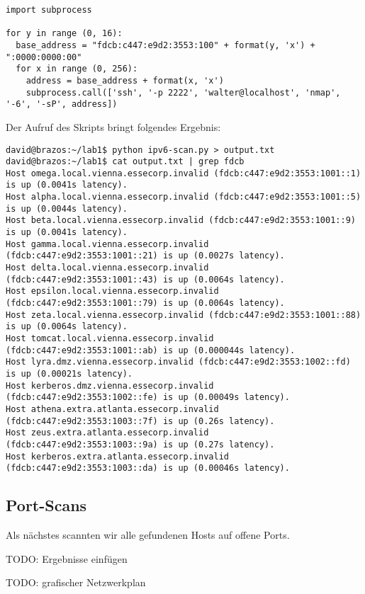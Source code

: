 \begin{lstlisting}
import subprocess

for y in range (0, 16):
  base_address = "fdcb:c447:e9d2:3553:100" + format(y, 'x') + ":0000:0000:00"
  for x in range (0, 256):
    address = base_address + format(x, 'x')
    subprocess.call(['ssh', '-p 2222', 'walter@localhost', 'nmap', '-6', '-sP', address])
\end{lstlisting}

Der Aufruf des Skripts bringt folgendes Ergebnis:

\begin{lstlisting}
david@brazos:~/lab1$ python ipv6-scan.py > output.txt
david@brazos:~/lab1$ cat output.txt | grep fdcb
Host omega.local.vienna.essecorp.invalid (fdcb:c447:e9d2:3553:1001::1) is up (0.0041s latency).
Host alpha.local.vienna.essecorp.invalid (fdcb:c447:e9d2:3553:1001::5) is up (0.0044s latency).
Host beta.local.vienna.essecorp.invalid (fdcb:c447:e9d2:3553:1001::9) is up (0.0041s latency).
Host gamma.local.vienna.essecorp.invalid (fdcb:c447:e9d2:3553:1001::21) is up (0.0027s latency).
Host delta.local.vienna.essecorp.invalid (fdcb:c447:e9d2:3553:1001::43) is up (0.0064s latency).
Host epsilon.local.vienna.essecorp.invalid (fdcb:c447:e9d2:3553:1001::79) is up (0.0064s latency).
Host zeta.local.vienna.essecorp.invalid (fdcb:c447:e9d2:3553:1001::88) is up (0.0064s latency).
Host tomcat.local.vienna.essecorp.invalid (fdcb:c447:e9d2:3553:1001::ab) is up (0.000044s latency).
Host lyra.dmz.vienna.essecorp.invalid (fdcb:c447:e9d2:3553:1002::fd) is up (0.00021s latency).
Host kerberos.dmz.vienna.essecorp.invalid (fdcb:c447:e9d2:3553:1002::fe) is up (0.00049s latency).
Host athena.extra.atlanta.essecorp.invalid (fdcb:c447:e9d2:3553:1003::7f) is up (0.26s latency).
Host zeus.extra.atlanta.essecorp.invalid (fdcb:c447:e9d2:3553:1003::9a) is up (0.27s latency).
Host kerberos.extra.atlanta.essecorp.invalid (fdcb:c447:e9d2:3553:1003::da) is up (0.00046s latency).
\end{lstlisting}

\subsection{Port-Scans}

Als nächstes scannten wir alle gefundenen Hosts auf offene Ports.

TODO: Ergebnisse einfügen

TODO: grafischer Netzwerkplan
